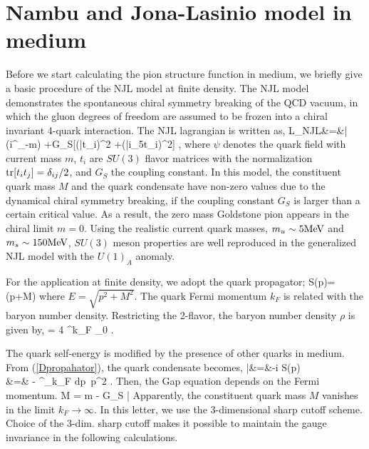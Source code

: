 \section{Nambu and Jona-Lasinio model in medium}
\bs
Before we start calculating the pion structure function in medium, we
briefly give a basic procedure of the NJL model
at finite density.  The NJL model demonstrates the spontaneous chiral
symmetry breaking of the QCD vacuum, in which the gluon degrees of
freedom are assumed to be frozen into a chiral invariant 4-quark
interaction.
The NJL lagrangian is written as,
%
%
\beq
{\cal L}_{NJL}&=&\bar{\psi}(i\gamma^{\mu}\partial_{\mu}-m)\psi
          +G_{S}[(\bar{\psi}t_{i}\psi)^2
                  +(\bar{\psi}i\gamma_{5}t_{i}\psi)^2] \;\; ,
\label{NJL_lag}
\eeq
%
%
where \(\psi\) denotes the quark field with current mass \(m\),
$t_{i}$ are $SU(3)$ flavor matrices with the normalization
$\mbox{tr} [t_i t_j] = \delta _{ij} /2$, and \(G_S\) the coupling constant.
In this model, the constituent quark mass $M$ and the quark condensate
{\qcon} have non-zero values due to the dynamical chiral symmetry
breaking, if the coupling constant $G_S$ is larger than a certain
critical value.
As a result, the zero mass Goldstone pion appears in the chiral
limit $m=0$\cite{NJL}.  Using the realistic current quark masses, $m_u
\sim 5\mbox{MeV}$ and $m_s \sim 150 \mbox{MeV}$,  $SU(3)$ meson
properties are well reproduced in the generalized NJL model with the
$U(1)_A$ anomaly\cite{Review_NJL}.




For the application at finite density, we adopt the quark propagator;
%
\beq
S(p)=(\not p+M)
\label{Dpropahator}
\eeq
%
%
where $E= \sqrt{p^2 + M^2}$.
The quark Fermi momentum $k_F$ is related with the baryon number
density.  Restricting the 2-flavor, the baryon number density $\rho$
is given by,
%
%
\beqn
\rho = 4 \int^{k_F} _0
{} \;.
\eeqn
%

The quark self-energy is modified by the presence of other
quarks in medium.  From (\ref{Dpropahator}), the quark condensate
becomes,
%
%
\beq
\langle \bar \psi \psi  \rangle &=&-i \tr {}S(p)\neqn\\
&=& -  \int^\Lambda _{k_{F}} {dp \,p^2} 
{} \;.
\label{Dcondensate}
\eeq
%
%
Then, the Gap equation depends on the Fermi momentum.
\beq
M = m - G_S  \langle  \bar{\psi} \psi  \rangle
\label{Gap}
\eeq
%
Apparently, the constituent quark mass $M$ vanishes in the limit
$k_F \to \infty$.
In this letter, we use the 3-dimensional sharp cutoff scheme.
Choice of the 3-dim. sharp cutoff makes it possible to maintain
the gauge
invariance in the following calculations\cite{Review_NJL}.


